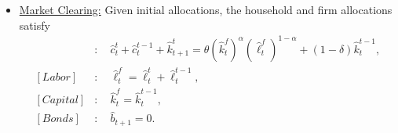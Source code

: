 \documentclass[11pt,english]{article}
\begin{document}
\begin{enumerate}
\begin{solution}
\begin{itemize}
\begin{align*}
\hat{w}_t &= \theta (1 - \alpha)\left(\hat{k}_t^f / \hat{\ell}_t^f\right)^{\alpha}
\end{align*}
\item \underline{Market Clearing:} Given initial allocations, the household and firm allocations satisfy
\begin{align*}
[Goods]&:\quad \hat{c}_t^t + \hat{c}_{t}^{t-1} + \hat{k}_{t+1}^t = \theta \left(\hat{k}_t^f\right)^\alpha\left(\hat{\ell}_t^f\right)^{1 - \alpha} + (1 - \delta) \hat{k}_t^{t-1},\\
[Labor]&:\quad \hat{\ell}_t^f = \hat{\ell}_t^t + \hat{\ell}_{t}^{t-1},\\
[Capital]&:\quad \hat{k}_t^f = \hat{k}_t^{t-1},\\
[Bonds]&:\quad \hat{b}_{t+1} = 0.
\end{align*}
\end{itemize}
    \end{solution}
 

\end{enumerate}
\end{document}
